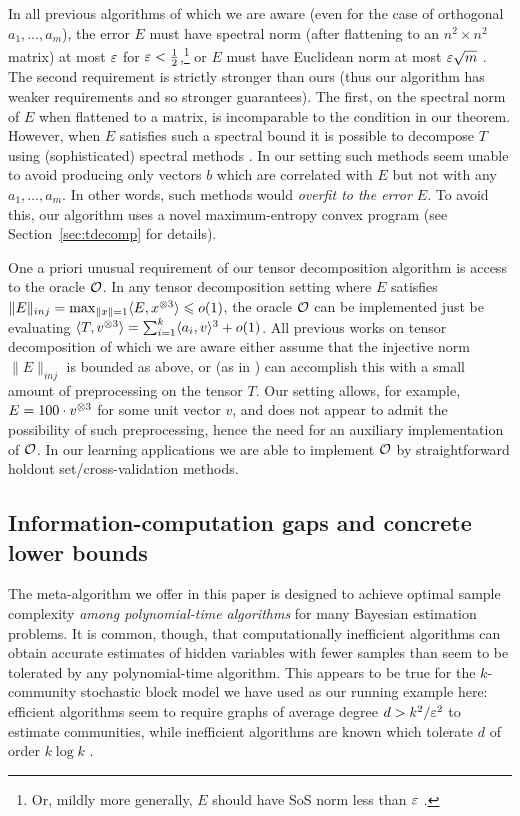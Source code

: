 In all previous algorithms of which we are aware (even for the case of orthogonal $a_1,\ldots,a_m$), the error $E$ must have spectral norm (after flattening to an $n^2 \times n^2$ matrix) at most $\varepsilon$ for $\varepsilon < \tfrac 12$,\footnote{Or, mildly more generally, $E$ should have SoS norm less than $\varepsilon$ \cite{DBLP:conf/focs/MaSS16}.} or $E$ must have Euclidean norm at most $\varepsilon \sqrt m$ \cite{DBLP:conf/colt/SchrammS17}.
The second requirement is strictly stronger than ours (thus our algorithm has weaker requirements and so stronger guarantees).
The first, on the spectral norm of $E$ when flattened to a matrix, is incomparable to the condition in our theorem.
However, when $E$ satisfies such a spectral bound it is possible to decompose $T$ using (sophisticated) spectral methods \cite{DBLP:conf/focs/MaSS16, DBLP:conf/colt/SchrammS17}.
In our setting such methods seem unable to avoid producing only vectors $b$ which are correlated with $E$ but not with any $a_1,\ldots,a_m$.
In other words, such methods would \emph{overfit to the error $E$}.
To avoid this, our algorithm uses a novel maximum-entropy convex program (see Section~\ref{sec:tdecomp} for details).

One a priori unusual requirement of our tensor decomposition algorithm is access to the oracle $\mathcal O$.
In any tensor decomposition setting where $E$ satisfies $\|E\|_{inj} = \max_{\|x\| = 1} \langle E, x^{\otimes 3}\rangle \leqslant o(1)$, the oracle $\mathcal O$ can be implemented just be evaluating $\langle T,v^{\otimes 3}\rangle = \sum_{i=1}^k \langle a_i,v\rangle^{3} + o(1)$.
All previous works on tensor decomposition of which we are aware either assume that the injective norm $\|E\|_{inj}$ is bounded as above, or (as in \cite{DBLP:conf/colt/SchrammS17}) can accomplish this with a small amount of preprocessing on the tensor $T$.
Our setting allows, for example, $E = 100 \cdot v^{\otimes 3}$ for some unit vector $v$, and does not appear to admit the possibility of such preprocessing, hence the need for an auxiliary implementation of $\mathcal O$.
In our learning applications we are able to implement $\mathcal O$ by straightforward holdout set/cross-validation methods.


\subsection{Information-computation gaps and concrete lower bounds}
\label{sec:intro-gaps}
The meta-algorithm we offer in this paper is designed to achieve optimal sample complexity \emph{among polynomial-time algorithms} for many Bayesian estimation problems.
It is common, though, that computationally inefficient algorithms can obtain accurate estimates of hidden variables with fewer samples than seem to be tolerated by any polynomial-time algorithm.
This appears to be true for the $k$-community stochastic block model we have used as our running example here: efficient algorithms seem to require graphs of average degree $d > k^2/\varepsilon^2$ to estimate communities, while inefficient algorithms are known which tolerate $d$ of order $k \log k$ \cite{DBLP:conf/isit/AbbeS16, DBLP:journals/corr/Moore17}.

